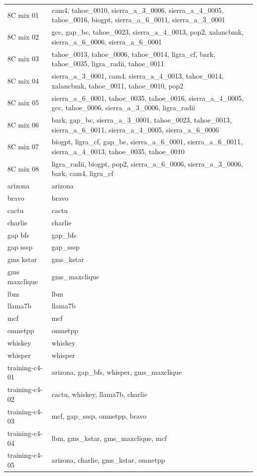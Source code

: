 \begin{tabular}{ll}
8C mix 01 & cam4, tahoe\_0010, sierra\_a\_3\_0006, sierra\_a\_4\_0005, tahoe\_0016, biogpt, sierra\_a\_6\_0011, sierra\_a\_3\_0001 \\
8C mix 02 & gcc, gap\_bc, tahoe\_0023, sierra\_a\_4\_0013, pop2, xalancbmk, sierra\_a\_6\_0006, sierra\_a\_6\_0001 \\
8C mix 03 & tahoe\_0013, tahoe\_0006, tahoe\_0014, ligra\_cf, bark, tahoe\_0035, ligra\_radii, tahoe\_0011 \\
8C mix 04 & sierra\_a\_3\_0001, cam4, sierra\_a\_4\_0013, tahoe\_0014, xalancbmk, tahoe\_0011, tahoe\_0010, pop2 \\
8C mix 05 & sierra\_a\_6\_0001, tahoe\_0035, tahoe\_0016, sierra\_a\_4\_0005, gcc, tahoe\_0006, sierra\_a\_3\_0006, ligra\_radii \\
8C mix 06 & bark, gap\_bc, sierra\_a\_3\_0001, tahoe\_0023, tahoe\_0013, sierra\_a\_6\_0011, sierra\_a\_4\_0005, sierra\_a\_6\_0006 \\
8C mix 07 & biogpt, ligra\_cf, gap\_bc, sierra\_a\_6\_0001, sierra\_a\_6\_0011, sierra\_a\_4\_0013, tahoe\_0035, tahoe\_0010 \\
8C mix 08 & ligra\_radii, biogpt, pop2, sierra\_a\_6\_0006, sierra\_a\_3\_0006, bark, cam4, ligra\_cf \\
arizona & arizona \\
bravo & bravo \\
cactu & cactu \\
charlie & charlie \\
gap bfs & gap\_bfs \\
gap sssp & gap\_sssp \\
gms kstar & gms\_kstar \\
gms maxclique & gms\_maxclique \\
lbm & lbm \\
llama7b & llama7b \\
mcf & mcf \\
omnetpp & omnetpp \\
whiskey & whiskey \\
whisper & whisper \\
training-c4-01 & arizona, gap\_bfs, whisper, gms\_maxclique \\
training-c4-02 & cactu, whiskey, llama7b, charlie \\
training-c4-03 & mcf, gap\_sssp, omnetpp, bravo \\
training-c4-04 & lbm, gms\_kstar, gms\_maxclique, mcf \\
training-c4-05 & arizona, charlie, gms\_kstar, omnetpp \\

\end{tabular}
